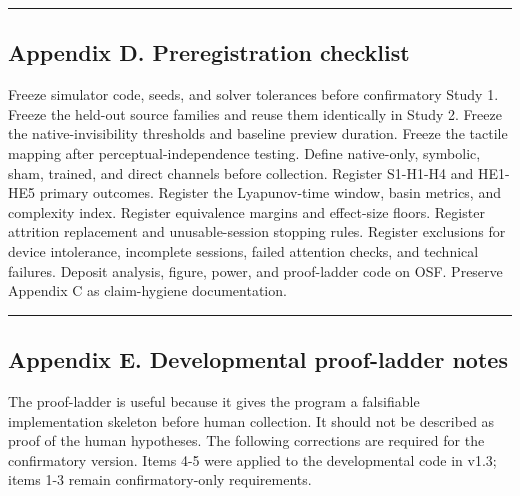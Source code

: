 \documentclass[
  11pt,
]{article}
\begin{document}
\begin{center}\rule{0.5\linewidth}{0.5pt}\end{center}

\subsection{Appendix D. Preregistration
checklist}\label{appendix-d.-preregistration-checklist}

Freeze simulator code, seeds, and solver
tolerances before confirmatory Study 1. Freeze
the held-out source families and reuse them
identically in Study 2. Freeze the
native-invisibility thresholds and baseline
preview duration. Freeze the tactile mapping
after perceptual-independence testing. Define
native-only, symbolic, sham, trained, and direct
channels before collection. Register S1-H1-H4
and HE1-HE5 primary outcomes. Register the
Lyapunov-time window, basin metrics, and
complexity index. Register equivalence margins
and effect-size floors. Register attrition
replacement and unusable-session stopping rules.
Register exclusions for device intolerance,
incomplete sessions, failed attention checks,
and technical failures. Deposit analysis,
figure, power, and proof-ladder code on OSF.
Preserve Appendix C as claim-hygiene
documentation.

\begin{center}\rule{0.5\linewidth}{0.5pt}\end{center}

\subsection{Appendix E. Developmental
proof-ladder
notes}\label{appendix-e.-developmental-proof-ladder-notes}

The proof-ladder is useful because it gives the
program a falsifiable implementation skeleton
before human collection. It should not be
described as proof of the human hypotheses. The
following corrections are required for the
confirmatory version. Items 4-5 were applied to
the developmental code in v1.3; items 1-3 remain
confirmatory-only requirements.
\end{document}
